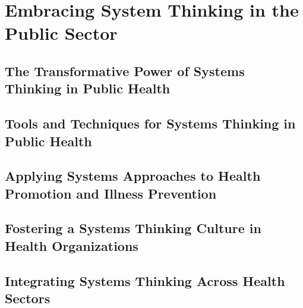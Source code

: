 \part[Embracing Systems Thinking]{Embracing System Thinking in the Public Sector}

\chapter{The Transformative Power of Systems Thinking in Public Health}

\chapter{Tools and Techniques for Systems Thinking in Public Health}

\chapter{Applying Systems Approaches to Health Promotion and Illness Prevention}

\chapter{Fostering a Systems Thinking Culture in Health Organizations}

\chapter{Integrating Systems Thinking Across Health Sectors}

